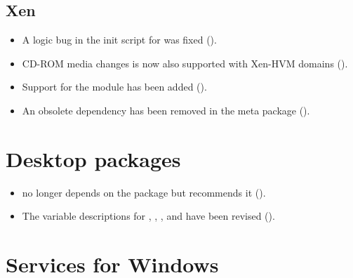 \subsection{Xen}
\begin{itemize}
\item A logic bug in the init script for  was fixed ().
\item CD-ROM media changes is now also supported with Xen-HVM domains ().
\item Support for the  module has been added ().
\item An obsolete dependency has been removed in the  meta package ().
\end{itemize}



\section{Desktop packages}
\begin{itemize}
\item {} no longer depends on the package
 but recommends it ().

\item The \ucsUCR{} variable descriptions for
  , ,
  , 
  and  have been revised ().

\end{itemize}


\section{Services for Windows}

